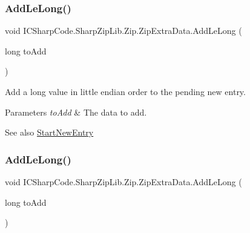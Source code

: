 \subsubsection{\texorpdfstring{Add\+Le\+Long()}{AddLeLong()}\hspace{0.1cm}{\footnotesize\ttfamily [1/2]}}
{\footnotesize\ttfamily void I\+C\+Sharp\+Code.\+Sharp\+Zip\+Lib.\+Zip.\+Zip\+Extra\+Data.\+Add\+Le\+Long (\begin{DoxyParamCaption}\item[{long}]{to\+Add }\end{DoxyParamCaption})\hspace{0.3cm}{\ttfamily [inline]}}



Add a long value in little endian order to the pending new entry. 


\begin{DoxyParams}{Parameters}
{\em to\+Add} & The data to add.\\
\hline
\end{DoxyParams}
\begin{DoxySeeAlso}{See also}
\hyperlink{class_i_c_sharp_code_1_1_sharp_zip_lib_1_1_zip_1_1_zip_extra_data_a3fd5ac216b1b6a0fe5ae92ea8156f20a}{Start\+New\+Entry}


\end{DoxySeeAlso}
\mbox{\label{class_i_c_sharp_code_1_1_sharp_zip_lib_1_1_zip_1_1_zip_extra_data_aafc11e296c9769e11ddfbc07dee754e7}} 
\subsubsection{\texorpdfstring{Add\+Le\+Long()}{AddLeLong()}\hspace{0.1cm}{\footnotesize\ttfamily [2/2]}}
{\footnotesize\ttfamily void I\+C\+Sharp\+Code.\+Sharp\+Zip\+Lib.\+Zip.\+Zip\+Extra\+Data.\+Add\+Le\+Long (\begin{DoxyParamCaption}\item[{long}]{to\+Add }\end{DoxyParamCaption})\hspace{0.3cm}{\ttfamily [inline]}}



